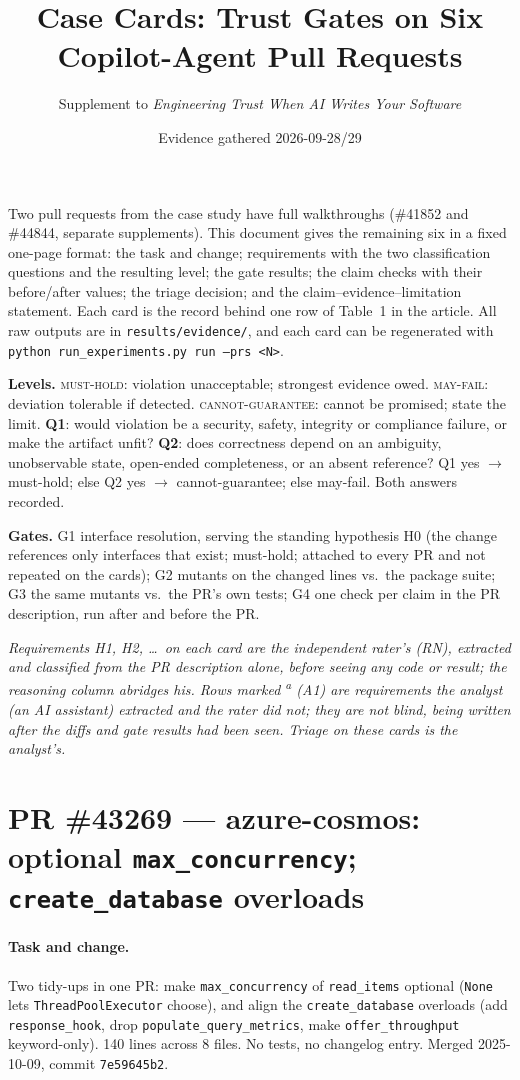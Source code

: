 \documentclass[11pt,a4paper]{article}
\title{Case Cards: Trust Gates on Six Copilot-Agent Pull Requests\\
\large \code{Azure/azure-sdk-for-python}}
\author{Supplement to \emph{Engineering Trust When AI Writes Your Software}}
\date{Evidence gathered 2026-09-28/29}
\newcommand{\code}[1]{\texttt{#1}}
\newcommand{\musthold}{\textsc{must-hold}}
\newcommand{\mayfail}{\textsc{may-fail}}
\newcommand{\cannot}{\textsc{cannot-guarantee}}
\newcommand{\card}[1]{\clearpage\section{#1}}
\newcommand{\sub}[1]{\paragraph{#1}}
\begin{document}
\maketitle

\noindent Two pull requests from the case study have full walkthroughs (\#41852 and \#44844, separate supplements). This document gives the remaining six in a fixed one-page format: the task and change; requirements with the two classification questions and the resulting level; the gate results; the claim checks with their before/after values; the triage decision; and the claim--evidence--limitation statement. Each card is the record behind one row of Table~1 in the article. All raw outputs are in \code{results/evidence/}, and each card can be regenerated with \code{python run\_experiments.py run --prs <N>}.

\medskip
\noindent\textbf{Levels.} \musthold: violation unacceptable; strongest evidence owed. \mayfail: deviation tolerable if detected. \cannot: cannot be promised; state the limit. \textbf{Q1}: would violation be a security, safety, integrity or compliance failure, or make the artifact unfit? \textbf{Q2}: does correctness depend on an ambiguity, unobservable state, open-ended completeness, or an absent reference? Q1 yes $\to$ must-hold; else Q2 yes $\to$ cannot-guarantee; else may-fail. Both answers recorded.

\medskip
\noindent\textbf{Gates.} G1 interface resolution, serving the standing hypothesis H0 (the change references only interfaces that exist; must-hold; attached to every PR and not repeated on the cards); G2 mutants on the changed lines vs.\ the package suite; G3 the same mutants vs.\ the PR's own tests; G4 one check per claim in the PR description, run after and before the PR.

\medskip
\noindent\textit{Requirements H1, H2, \ldots\ on each card are the independent rater's (RN), extracted and classified from the PR description alone, before seeing any code or result; the reasoning column abridges his. Rows marked \textsuperscript{a} (A1) are requirements the analyst (an AI assistant) extracted and the rater did not; they are not blind, being written after the diffs and gate results had been seen. Triage on these cards is the analyst's.}

\card{PR \#43269 — azure-cosmos: optional \code{max\_concurrency}; \code{create\_database} overloads}

\sub{Task and change.} Two tidy-ups in one PR: make \code{max\_concurrency} of \code{read\_items} optional (\code{None} lets \code{ThreadPoolExecutor} choose), and align the \code{create\_database} overloads (add \code{response\_hook}, drop \code{populate\_query\_metrics}, make \code{offer\_throughput} keyword-only). 140 lines across 8 files. No tests, no changelog entry. Merged 2025-10-09, commit \code{7e59645b2}.
\end{document}
